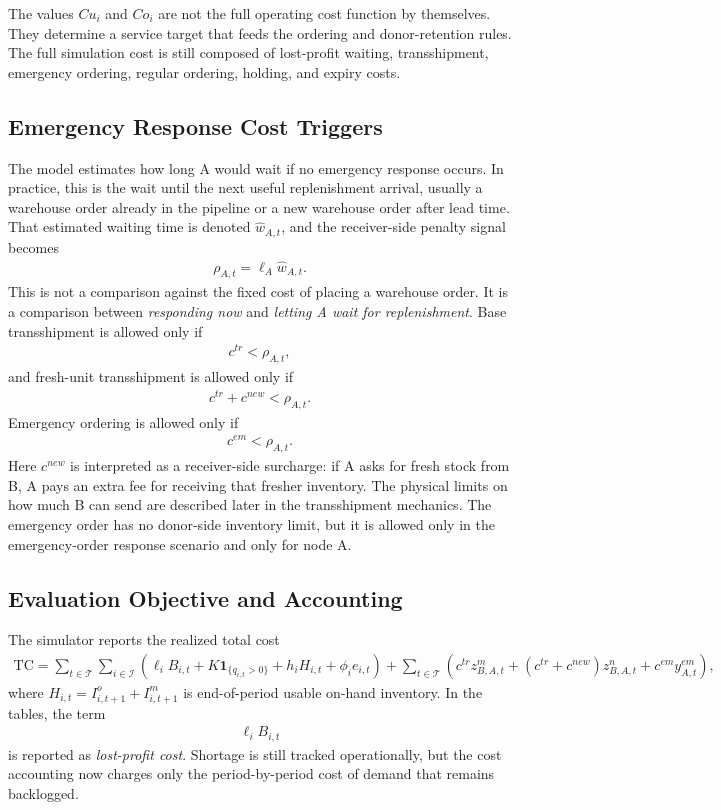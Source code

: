 \documentclass[11pt]{article}
\begin{document}
The values $Cu_i$ and $Co_i$ are not the full operating cost function by themselves. They determine a service target that feeds the ordering and donor-retention rules. The full simulation cost is still composed of lost-profit waiting, transshipment, emergency ordering, regular ordering, holding, and expiry costs.

\subsection{Emergency Response Cost Triggers}
The model estimates how long A would wait if no emergency response occurs. In practice, this is the wait until the next useful replenishment arrival, usually a warehouse order already in the pipeline or a new warehouse order after lead time. That estimated waiting time is denoted $\hat{w}_{A,t}$, and the receiver-side penalty signal becomes
\begin{align}
\rho_{A,t} = \ell_A \hat{w}_{A,t}.
\end{align}
This is not a comparison against the fixed cost of placing a warehouse order. It is a comparison between \emph{responding now} and \emph{letting A wait for replenishment}. Base transshipment is allowed only if
\begin{align}
c^{tr} < \rho_{A,t},
\end{align}
and fresh-unit transshipment is allowed only if
\begin{align}
c^{tr} + c^{new} < \rho_{A,t}.
\end{align}
Emergency ordering is allowed only if
\begin{align}
c^{em} < \rho_{A,t}.
\end{align}
Here $c^{new}$ is interpreted as a receiver-side surcharge: if A asks for fresh stock from B, A pays an extra fee for receiving that fresher inventory. The physical limits on how much B can send are described later in the transshipment mechanics. The emergency order has no donor-side inventory limit, but it is allowed only in the emergency-order response scenario and only for node A.

\subsection{Evaluation Objective and Accounting}
The simulator reports the realized total cost
\begin{align}
\text{TC} =
\sum_{t \in \mathcal{T}} \sum_{i \in \mathcal{I}}
\left(
\ell_i B_{i,t}
+ K \mathbf{1}_{\{q_{i,t}>0\}}
+ h_i H_{i,t}
+ \phi_i e_{i,t}
\right)
+ \sum_{t \in \mathcal{T}} \left(c^{tr} z^m_{B,A,t} + (c^{tr}+c^{new}) z^n_{B,A,t} + c^{em} y^{em}_{A,t}\right),
\end{align}
where $H_{i,t}=I^o_{i,t+1}+I^m_{i,t+1}$ is end-of-period usable on-hand inventory. In the tables, the term
\begin{align}
\ell_i B_{i,t}
\end{align}
is reported as \emph{lost-profit cost}. Shortage is still tracked operationally, but the cost accounting now charges only the period-by-period cost of demand that remains backlogged.
\end{document}

